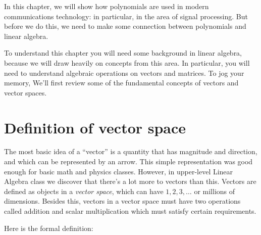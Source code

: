 
In this chapter, we will show how polynomials are used in modern communications technology: in particular, in the area of signal processing. But before we do this, we need to make some connection between polynomials and linear algebra.

To understand this chapter you will need some background in linear algebra, because we will draw heavily on concepts from this area. In particular, you will need to understand algebraic operations on vectors and matrices. To jog your memory,  We'll first review some of the fundamental concepts of vectors and vector spaces. 

\section{Definition of  vector space}
The most basic idea of a ``vector'' is  a quantity that has magnitude and direction, and which can be represented by an arrow. This simple representation was good enough for basic math and physics classes. However, in upper-level Linear Algebra class we discover that there's a lot more to vectors than this. Vectors are defined as objects in a \emph{vector space}, which can have $1,2,3, \ldots$ or millions of dimensions. Besides this, vectors in a vector space must have two operations called addition and scalar multiplication which must satisfy certain requirements. 

Here is the formal definition:

